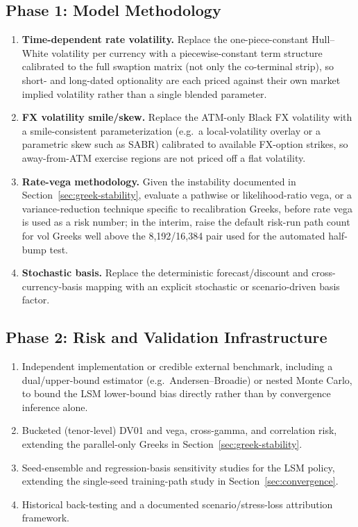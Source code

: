 \documentclass[conference]{IEEEtran}
\begin{document}
\subsection{Phase 1: Model Methodology}
\begin{enumerate}
  \item \textbf{Time-dependent rate volatility.} Replace the one-piece-constant Hull--White volatility per currency with a piecewise-constant term structure calibrated to the full swaption matrix (not only the co-terminal strip), so short- and long-dated optionality are each priced against their own market implied volatility rather than a single blended parameter.
  \item \textbf{FX volatility smile/skew.} Replace the ATM-only Black FX volatility with a smile-consistent parameterization (e.g.\ a local-volatility overlay or a parametric skew such as SABR) calibrated to available FX-option strikes, so away-from-ATM exercise regions are not priced off a flat volatility.
  \item \textbf{Rate-vega methodology.} Given the instability documented in Section~\ref{sec:greek-stability}, evaluate a pathwise or likelihood-ratio vega, or a variance-reduction technique specific to recalibration Greeks, before rate vega is used as a risk number; in the interim, raise the default risk-run path count for vol Greeks well above the 8,192/16,384 pair used for the automated half-bump test.
  \item \textbf{Stochastic basis.} Replace the deterministic forecast/discount and cross-currency-basis mapping with an explicit stochastic or scenario-driven basis factor.
\end{enumerate}

\subsection{Phase 2: Risk and Validation Infrastructure}
\begin{enumerate}
  \item Independent implementation or credible external benchmark, including a dual/upper-bound estimator (e.g.\ Andersen--Broadie) or nested Monte Carlo, to bound the LSM lower-bound bias directly rather than by convergence inference alone.
  \item Bucketed (tenor-level) DV01 and vega, cross-gamma, and correlation risk, extending the parallel-only Greeks in Section~\ref{sec:greek-stability}.
  \item Seed-ensemble and regression-basis sensitivity studies for the LSM policy, extending the single-seed training-path study in Section~\ref{sec:convergence}.
  \item Historical back-testing and a documented scenario/stress-loss attribution framework.
\end{enumerate}
\end{document}

